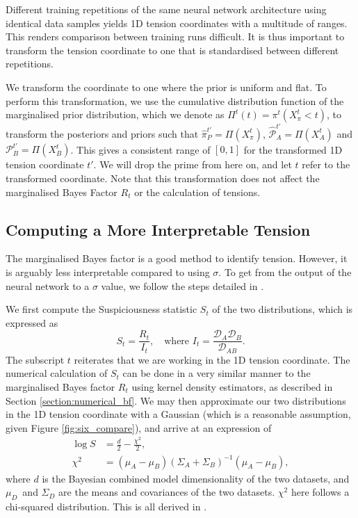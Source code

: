 \documentclass[%
 reprint,
 amsmath,amssymb,
 aps,
]{revtex4-2}
\begin{document}
Different training repetitions of the same neural network architecture using identical data samples yields 1D tension coordinates with a multitude of ranges. This renders comparison between training runs difficult. It is thus important to transform the tension coordinate to one that is standardised between different repetitions.

We transform the coordinate to one where the prior is uniform and flat. To perform this transformation, we use the cumulative distribution function of the marginalised prior distribution, which we denote as $\Pi^t(t) = \pi^t(X_\pi^t < t)$, to transform the posteriors and priors such that $\hat{\pi}^{t'}_P = \Pi(X_\pi^t)$, $\hat{\mathcal{P}}_A^{t'} = \Pi(X_A^t)$ and $\mathcal{P}_B^{t'} = \Pi(X_B^t)$. This gives a consistent range of $[0, 1]$ for the transformed 1D tension coordinate $t'$. We will drop the prime from here on, and let $t$ refer to the transformed coordinate. Note that this transformation does not affect the marginalised Bayes Factor $R_t$ or the calculation of tensions.


\subsection{Computing a More Interpretable Tension}

The marginalised Bayes factor is a good method to identify tension. However, it is arguably less interpretable compared to using $\sigma$. To get from the output of the neural network to a $\sigma$ value, we follow the steps detailed in \cite{Handley2021}.

We first compute the Suspiciousness statistic $S_t$ of the two distributions, which is expressed as
\begin{equation}
    S_t = \frac{R_t}{I_t}, \quad \textrm{where } I_t = \frac{\mathcal{D}_A \mathcal{D}_B}{\mathcal{D}_{AB}}.
\end{equation} 
The subscript $t$ reiterates that we are working in the 1D tension coordinate. The numerical calculation of $S_t$ can be done in a very similar manner to the marginalised Bayes factor $R_t$ using kernel density estimators, as described in Section \ref{section:numerical_bf}. We may then approximate our two distributions in the 1D tension coordinate with a Gaussian (which is a reasonable assumption, given Figure \ref{fig:six_compare}), and arrive at an expression of 
\begin{align}
    \log S &= \frac{d}{2} - \frac{\chi^2}{2}, \\
    \chi^2 &= (\mu_A - \mu_B)(\Sigma_A + \Sigma_B)^{-1}(\mu_A - \mu_B),
\end{align}
where $d$ is the Bayesian combined model dimensionality \cite{Handley2019} of the two datasets, and  $\mu_D$\ and $\Sigma_D$ are the means and covariances of the two datasets. $\chi^2$ here follows a chi-squared distribution. This is all derived in \cite{Handley2019}.
\end{document}
